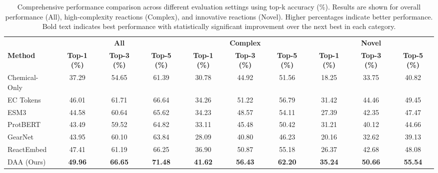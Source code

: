 \begin{table*}[!ht]\centering
\caption{Comprehensive performance comparison across different evaluation settings using top-k accuracy (\%). Results are shown for overall performance (All), high-complexity reactions (Complex), and innovative reactions (Novel). Higher percentages indicate better performance. Bold text indicates best performance with statistically significant improvement over the next best in each category.}
\label{tab:res-main}
\begin{tabular}{l|ccc|ccc|ccc}\toprule
& \multicolumn{3}{c|}{\textbf{All}} & \multicolumn{3}{c|}{\textbf{Complex}} & \multicolumn{3}{c}{\textbf{Novel}} \\
\textbf{Method} & \textbf{Top-1 (\%)} & \textbf{Top-3 (\%)} & \textbf{Top-5 (\%)} & \textbf{Top-1 (\%)} & \textbf{Top-3 (\%)} & \textbf{Top-5 (\%)} & \textbf{Top-1 (\%)} & \textbf{Top-3 (\%)} & \textbf{Top-5 (\%)} \\\midrule
Chemical-Only \cite{kreutter2021predicting} &37.29 &54.65 &61.39 &30.78 &44.92 &51.56 &18.25 &33.75 &40.82 \\
EC Tokens \cite{Probst2022} &46.01 &61.71 &66.64 &34.26 &51.22 &56.79 &31.42 &44.46 &49.45 \\
ESM3 \cite{hayes2024simulating} &44.58 &60.64 &65.62 &34.23 &48.57 &54.11 &27.39 &42.35 &47.47 \\
ProtBERT \cite{brandes2021proteinbert} &43.49 &59.52 &64.82 &33.11 &45.48 &50.42 &31.21 &40.12 &44.66 \\
GearNet \cite{zhang2023protein} &43.95 &60.10 &63.84 &28.09 &40.80 &46.23 &20.16 &32.62 &39.13 \\
ReactEmbed\cite{sicherman2025reactembed} &47.41 &61.19 &66.25 &36.90 &50.87 &55.18 &26.37 &42.68 &48.08 \\
DAA (Ours) &\textbf{49.96} &\textbf{66.65} &\textbf{71.48} &\textbf{41.62} &\textbf{56.43} &\textbf{62.20} &\textbf{35.24} &\textbf{50.66} &\textbf{55.54} \\
\bottomrule
\end{tabular}
\end{table*}
